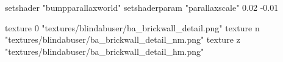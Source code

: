 	setshader "bumpparallaxworld"
	setshaderparam "parallaxscale" 0.02 -0.01

		texture 0 "textures/blindabuser/ba_brickwall_detail.png"
		texture n "textures/blindabuser/ba_brickwall_detail_nm.png"
		texture z "textures/blindabuser/ba_brickwall_detail_hm.png"

